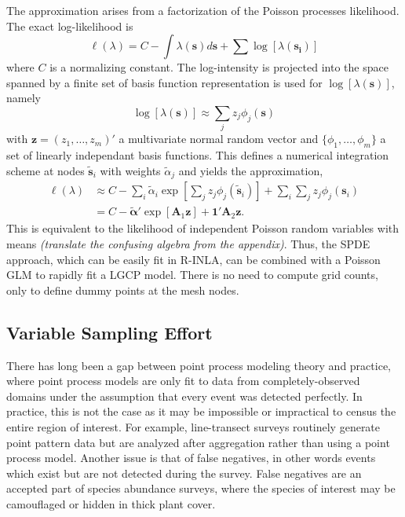 \documentclass[]{interact}
\begin{document}
The approximation arises from a factorization of the Poisson processes
likelihood. The exact log-likelihood is
\begin{displaymath}
\ell(\lambda) = C - \int \lambda(\mathbf{s}) d\mathbf{s}
+ \sum \log\left[\lambda(\mathbf{s_{i}})\right]
\end{displaymath}
where \(C\) is a normalizing constant. The log-intensity is projected into the
space spanned by a finite set of basis function
representation is used for \(\log[\lambda(\mathbf{s})]\), namely
\begin{displaymath}
\log\left[\lambda(\mathbf{s})\right]
\approx \sum_{j} z_{j} \phi_{j}(\mathbf{s})
\end{displaymath}
with \(\mathbf{z} = (z_{1}, \dots, z_{m})'\) a multivariate normal random
vector and \(\{\phi_{1}, \dots, \phi_{m}\}\) a set of linearly independant
basis functions.
This defines a numerical integration scheme at nodes \(\tilde{\mathbf{s}}_{i}\)
with weights \(\tilde{\alpha}_{j}\) and yields the approximation,
\begin{align*}
\ell(\lambda) &\approx C - \sum_{i} \tilde{\alpha}_{i}
\exp\left[\sum_{j} z_{j}\phi_{j}(\tilde{\mathbf{s}}_{i})\right]
+ \sum_{i} \sum_{j} z_{j}\phi_{j}(\mathbf{s}_{i}) \\
& = C - \tilde{\boldsymbol{\alpha}}'
\exp\left[\mathbf{A}_{1} \mathbf{z}\right]
+ \mathbf{1}' \mathbf{A}_{2} \mathbf{z}.
\end{align*}
This is equivalent to the likelihood of independent Poisson random variables
with means {\it (translate the confusing algebra from the appendix)}. Thus,
the SPDE approach, which can be easily fit in R-INLA, can be combined with a
Poisson GLM to rapidly fit a LGCP model. There is no need to compute grid
counts, only to define dummy points at the mesh nodes.



\subsection{Variable Sampling Effort}

There has long been a gap between point process modeling theory and practice,
where point process models are only fit to data from completely-observed
domains under the assumption that every event was detected perfectly. In
practice, this is not the case as it may be impossible or impractical to census
the entire region of interest. For example, line-transect surveys routinely
generate point pattern data but are analyzed after aggregation rather than
using a point process model. Another issue is that of false negatives, in other
words events which exist but are not detected during the survey. False
negatives are an accepted part of species abundance surveys, where the species
of interest may be camouflaged or hidden in thick plant cover.
\end{document}
